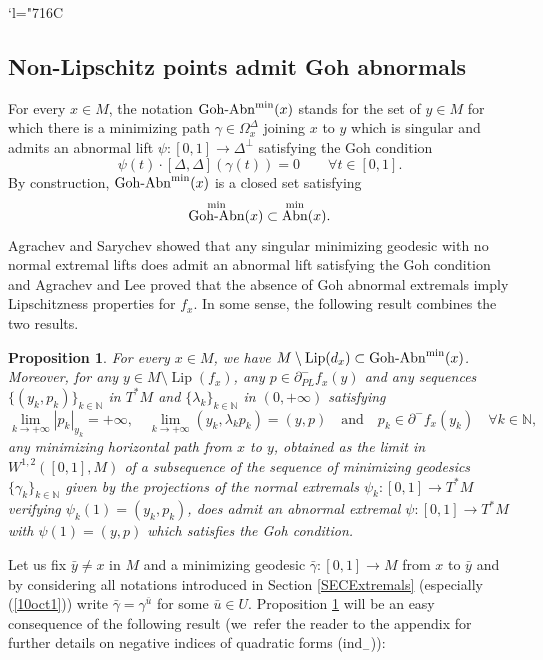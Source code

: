 \documentclass[JEP,XML,SOM,Unicode,NoFloatCountersInSection,published]{cedram}
\newcommand{\Changelback}{\mathcode`l="716C}
\DeclareMathOperator{\Abn}{Abn}
\DeclareMathOperator{\GohAbn}{Goh\textup{-}Abn}
\DeclareMathOperator{\Lip}{Lip}
\newcommand\N{\mathbb N}
\newtheorem{proposition}[theorem]{Proposition}
\theoremstyle{definition}
\begin{document}
\Changelback

\subsection{Non-Lipschitz points admit Goh abnormals}\label{SECGoh}

For every $x\in M$, the notation $\GohAbn^{\min}(x)$ stands for the set of $y\in M$ for which there is a minimizing path $\gamma \in \Omega^{\Delta}_x$ joining $x$ to $y$ which is singular and admits an abnormal lift $\psi:[0,1] \to \Delta^{\perp}$ satisfying the Goh condition
\begin{equation}\label{Goh26sept}
\psi(t) \cdot [\Delta,\Delta](\gamma(t)) = 0 \qquad \forall t \in [0,1].
\end{equation}
By construction, $\GohAbn^{\min}(x)$ is a closed set satisfying
\[
\GohAbn^{\min}(x) \subset \Abn^{\min}(x).
\]
Agrachev and Sarychev \cite{as99} showed that any singular minimizing geodesic with no normal extremal lifts does admit an abnormal lift satisfying the Goh condition and Agrachev and Lee \cite{al09} proved that the absence of Goh abnormal extremals imply Lipschitzness properties for $f_x$. In some sense, the following result combines the two results.

\begin{proposition}\label{PROPGohLip}
For every $x\in M$, we have $M\setminus \Lip(d_x) \subset \GohAbn^{\min}(x)$. Moreover, for any $y\in M \setminus \Lip(f_x) $, any $p \in \partial^-_{PL}f_x(y)$ and any sequences $\{(y_k,p_k)\}_{k\in \N}$ in $T^*M$ and $\{\lambda_k\}_{k\in \N}$ in $(0,+\infty)$ satisfying
\[
\lim_{k\to +\infty} \left|p_k\right|_{y_k} = +\infty, \quad \lim_{k\to +\infty} \left(y_k,\lambda_k p_k\right) = (y,p)
\quad \text{and} \quad p_k \in \partial^-f_x(y_k) \quad \forall k \in \N,
\]
any minimizing horizontal path from $x$ to $y$, obtained as the limit in $W^{1,2}([0,1],M)$ of a subsequence of the sequence of minimizing geodesics $\{\gamma_k\}_{k\in \N}$ given by the projections of the normal extremals $\psi_k:[0,1] \to T^*M$ verifying $\psi_k(1)=(y_k,p_k)$, does admit an abnormal extremal $\psi:[0,1] \to T^*M$ with $\psi(1)=(y,p)$ which satisfies the Goh condition.
\end{proposition}

Let us fix $\bar{y}\neq x$ in $M$ and a minimizing geodesic $\bar{\gamma} : [0,1] \to M$ from $x$ to $\bar{y}$ and by considering all notations introduced in Section \ref{SECExtremals} (especially (\ref{10oct1})) write $\bar{\gamma}=\gamma^{\bar{u}}$ for some $\bar{u}\in U$. Proposition \ref{PROPGohLip} will be an easy consequence of the following result (we~refer the reader to the appendix for further details on negative indices of quadratic forms ($ \mathrm{ind}_-$)):
\end{document}
